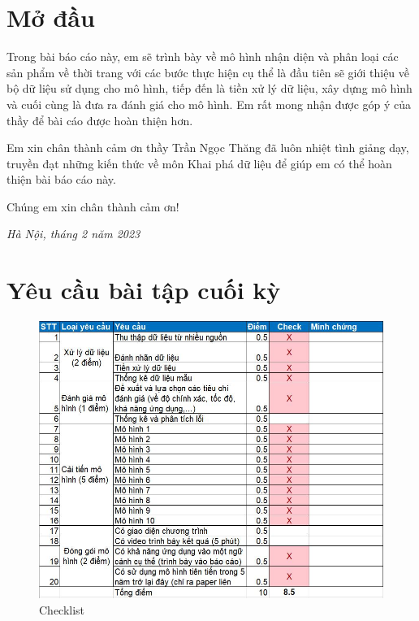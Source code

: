\section*{Mở đầu}
Trong bài báo cáo này, em sẽ trình bày về mô hình nhận diện và phân loại các sản phẩm về thời trang với các bước thực hiện cụ thể là đầu tiên sẽ giới thiệu về bộ dữ liệu sử dụng cho mô hình, tiếp đến là tiền xử lý dữ liệu, xây dựng mô hình và cuối cùng là đưa ra đánh giá cho mô hình. Em rất mong nhận được góp ý của thầy để bài cáo được hoàn thiện hơn.

\indent Em xin chân thành cảm ơn thầy Trần Ngọc Thăng đã luôn nhiệt tình giảng dạy, truyền đạt những kiến thức về môn Khai phá dữ liệu để giúp em có thể hoàn thiện bài báo cáo này.

\indent Chúng em xin chân thành cảm ơn!

\begin{minipage}{0.5\textwidth}
\end{minipage}
\hspace{0.5\textwidth}
\begin{minipage}{0.5\textwidth}
	\noindent\begin{center}
		\vspace{0.5cm}
		\textit{Hà Nội, tháng 2 năm 2023}
		\textbf{}
	\end{center}	
\end{minipage}

\newpage
\renewcommand{\arraystretch}{2}

\section*{Yêu cầu bài tập cuối kỳ}
\begin{center}
    \begin{figure}[!h]
        \centering
        \includegraphics[scale = 1]{fileanh/yeucau.jpg}
        \caption{Checklist}
    \end{figure}
\end{center}
